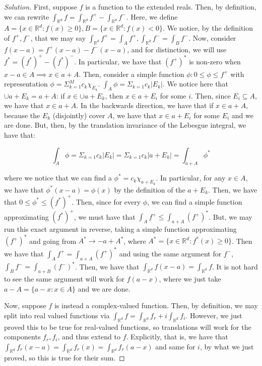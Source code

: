 \documentclass[10pt]{article}
\begin{document}
\begin{proof}[Solution]

First, suppose $f$ is a function to the extended reals. Then, by definition, we can rewrite $\int_{\mathbb{R}^d} f = \int_{\mathbb{R}^d} f^+ - \int_{\mathbb{R}^d} f^-$. Here, we define $A = \{ x \in \mathbb{R}^d : f(x) \geq 0 \}, B = \{ x \in \mathbb{R}^d : f(x) < 0 \}$. We notice, by the definition of $f^+, f^-$, that we may say $\int_{\mathbb{R}^d} f^+ = \int_A f^+, \int_{\mathbb{R}^d} f^- = \int_B f^-$. Now, consider $f(x-a) = f^+(x-a) - f^-(x-a)$, and for distinction, we will use $f^* = (f^*)^+ - (f^*)^-$. In particular, we have that $(f^+)^*$ is non-zero when $x -a \in A \implies x \in a + A$. Then, consider a simple function $\phi : 0 \leq \phi \leq f^+$ with representation $\phi = \Sigma_{k=1}^M c_k \chi_{E_k}$. $\int_A \phi = \Sigma_{k=1} c_k |E_k|$. We notice here that $\cup a + E_k = a + A$: if $x \in \cup a + E_k$, then $x \in a + E_i$ for some $i$. Then, since $E_i \subseteq A$, we have that $x \in a + A$. In the backwards direction, we have that if $x \in a + A$, because the $E_k$ (disjointly) cover $A$, we have that $x \in a + E_i$ for some $E_i$ and we are done. But, then, by the translation invariance of the Lebesgue integral, we have that:

$$\int_A \phi = \Sigma_{k=1} c_k |E_k| = \Sigma_{k=1} c_k |a + E_k| = \int_{a + A} \phi^*$$

where we notice that we can find a $\phi^* = c_k \chi_{a + E_k}$. In particular, for any $x \in A$, we have that $\phi^*(x-a) = \phi(x)$ by the definition of the $a + E_k$. Then, we have that $0 \leq \phi^* \leq (f^*)^+$. Then, since for every $\phi$, we can find a simple function approximating $(f^*)^+$, we must have that $\int_A f^+ \leq \int_{a + A} (f^+)^*$. But, we may run this exact argument in reverse, taking a simple function approximating $(f^+)^*$ and going from $A^* \to -a + A^*$, where $A^* = \{ x \in \mathbb{R}^d : f^*(x) \geq 0 \}$. Then we have that $\int_A f^+ = \int_{a + A} (f^+)^*$ and using the same argument for $f^-$, $\int_B f^- = \int_{a + B} (f^-)^*$. Then, we have that $ \int_{\mathbb{R}^d} f(x-a) = \int_{\mathbb{R}^d} f $. It is not hard to see the same argument will work for $ f(a-x)$, where we just take $a - A = \{ a - x : x \in A \}$ and we are done.

Now, suppose $f$ is instead a complex-valued function. Then, by definition, we may split into real valued functions via $\int_{\mathbb{R}^d} f = \int_{\mathbb{R}^d} f_r + i\int_{\mathbb{R}^d} f_i$. However, we just proved this to be true for real-valued functions, so translations will work for the components $f_r, f_i$, and thus extend to $f$. Explicitly, that is, we have that $ \int_{\mathbb{R}^d} f_r(x-a) =  \int_{\mathbb{R}^d} f_r(x) =  \int_{\mathbb{R}^d} f_r(a-x)$ and same for $i$, by what we just proved, so this is true for their sum.

\end{proof}
\end{document}
